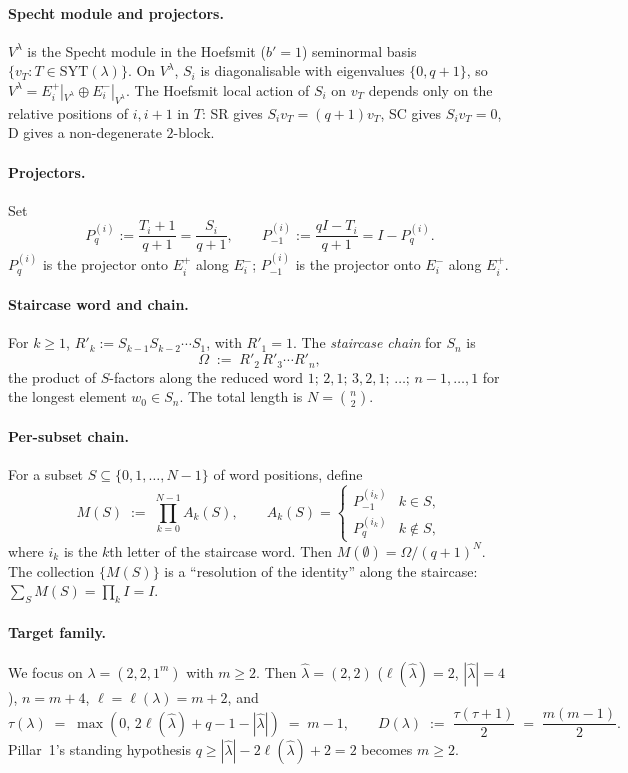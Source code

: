 \documentclass[11pt]{article}
\theoremstyle{definition}
\newcommand{\Sn}{S_n}
\newcommand{\Vlam}{V^\lambda}
\newcommand{\Om}{\Omega}
\newcommand{\hatl}{\widehat\lambda}
\newcommand{\elh}{\ell(\hatl)}
\newcommand{\Rp}{R'}
\newcommand{\SYT}{\mathrm{SYT}}
\newcommand{\Eplus}[1]{E^+_{#1}}
\newcommand{\Eminus}[1]{E^-_{#1}}
\begin{document}
\paragraph{Specht module and projectors.}
$\Vlam$ is the Specht module in the Hoefsmit ($b'=1$) seminormal basis
$\{v_T : T \in \SYT(\lambda)\}$. On $\Vlam$, $S_i$ is diagonalisable with
eigenvalues $\{0, q+1\}$, so $\Vlam = \Eplus i|_{\Vlam} \oplus \Eminus
i|_{\Vlam}$. The Hoefsmit local action of $S_i$ on $v_T$ depends only on the
relative positions of $i, i+1$ in $T$: SR gives $S_i v_T = (q+1)v_T$, SC
gives $S_i v_T = 0$, D gives a non-degenerate $2$-block.

\paragraph{Projectors.}
Set
\[
   P_q^{(i)} := \frac{T_i + 1}{q+1} = \frac{S_i}{q+1},
   \qquad
   P_{-1}^{(i)} := \frac{q I - T_i}{q+1} = I - P_q^{(i)}.
\]
$P_q^{(i)}$ is the projector onto $\Eplus i$ along $\Eminus i$;
$P_{-1}^{(i)}$ is the projector onto $\Eminus i$ along $\Eplus i$.

\paragraph{Staircase word and chain.}
For $k \ge 1$, $\Rp_k := S_{k-1} S_{k-2} \cdots S_1$, with $\Rp_1 = 1$. The
\emph{staircase chain} for $\Sn$ is
\[
   \Om \;:=\; \Rp_2\,\Rp_3 \cdots \Rp_n,
\]
the product of $S$-factors along the reduced word
$1;\,2,1;\,3,2,1;\,\ldots;\,n-1,\ldots,1$ for the longest element
$w_0 \in \Sn$. The total length is $N = \binom{n}{2}$.

\paragraph{Per-subset chain.}
For a subset $S \subseteq \{0,1,\ldots,N-1\}$ of word positions, define
\[
   M(S) \;:=\; \prod_{k=0}^{N-1} A_k(S),
   \qquad
   A_k(S) = \begin{cases} P_{-1}^{(i_k)} & k \in S, \\
                          P_q^{(i_k)}   & k \notin S, \end{cases}
\]
where $i_k$ is the $k$th letter of the staircase word.
Then $M(\emptyset) = \Om / (q+1)^N$. The collection $\{M(S)\}$ is a
``resolution of the identity'' along the staircase:
$\sum_S M(S) = \prod_k I = I$.

\paragraph{Target family.}
We focus on $\lambda = (2, 2, 1^m)$ with $m \ge 2$. Then $\hatl = (2,2)$
($\elh = 2$, $|\hatl|=4$), $n = m + 4$, $\ell = \ell(\lambda) = m+2$, and
\[
   \tau(\lambda) \;=\; \max(0,\, 2\elh + q - 1 - |\hatl|) \;=\; m-1,
   \qquad
   D(\lambda) \;:=\; \frac{\tau(\tau+1)}{2} \;=\; \frac{m(m-1)}{2}.
\]
Pillar~1's standing hypothesis $q \ge |\hatl|-2\elh+2 = 2$ becomes $m \ge 2$.
\end{document}
